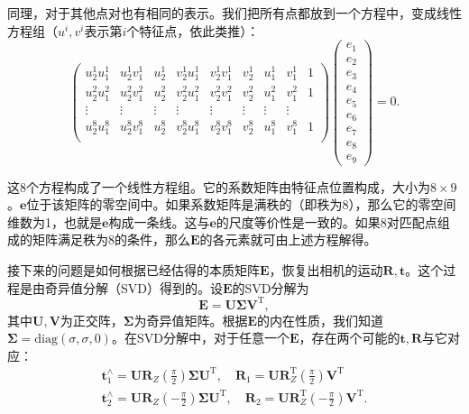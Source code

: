 同理，对于其他点对也有相同的表示。我们把所有点都放到一个方程中，变成线性方程组（$u^i, v^i$表示第$i$个特征点，依此类推）：
\begin{equation}
\label{Eq:eight-point}
\begin{pmatrix}
u_{2}^{1}u_{1}^{1}& u_{2}^{1}v_{1}^{1}& u_{2}^{1}& v_{2}^{1}u_{1}^{1}& v_{2}^{1}v_{1}^{1}& v_{2}^{1} &u_{1}^{1} &v_{1}^{1}&1\\
u_{2}^{2}u_{1}^{2}& u_{2}^{2}v_{1}^{2}& u_{2}^{2}& v_{2}^{2}u_{1}^{2}& v_{2}^{2}v_{1}^{2}& v_{2}^{2} &u_{1}^{2} &v_{1}^{2}&1\\
\vdots & \vdots & \vdots & \vdots & \vdots & \vdots & \vdots & \vdots \\
u_{2}^{8}u_{1}^{8}& u_{2}^{8}v_{1}^{8}& u_{2}^{8}& v_{2}^{8}u_{1}^{8}& v_{2}^{8}v_{1}^{8}& v_{2}^{8} &u_{1}^{8}&v_{1}^{8}&1\\
\end{pmatrix}
\begin{pmatrix}
e_{1}\\ e_{2}\\ e_{3}\\  e_{4}\\ e_{5}\\ e_{6}\\ e_{7}\\ e_{8}\\ e_{9}  
\end{pmatrix}
=0.
\end{equation}

这8个方程构成了一个线性方程组。它的系数矩阵由特征点位置构成，大小为$8 \times 9$。$\bm{e}$位于该矩阵的零空间中。如果系数矩阵是满秩的（即秩为8），那么它的零空间维数为1，也就是$\bm{e}$构成一条线。这与$\bm{e}$的尺度等价性是一致的。如果8对匹配点组成的矩阵满足秩为8的条件，那么$\bm{E}$的各元素就可由上述方程解得。

接下来的问题是如何根据已经估得的本质矩阵$\bm{E}$，恢复出相机的运动$\bm{R}, \bm{t}$。这个过程是由奇异值分解（SVD）得到的。设$\bm{E}$的SVD分解为
\begin{equation}
\bm{E} = \bm{U} \bm{\Sigma} \bm{V}^\mathrm{T},
\end{equation}
其中$\bm{U}, \bm{V}$为正交阵，$\bm{\Sigma}$为奇异值矩阵。根据$\bm{E}$的内在性质，我们知道$\bm{\Sigma} = \mathrm{diag}( \sigma, \sigma, 0 )$。在SVD分解中，对于任意一个$\bm{E}$，存在两个可能的$\bm{t}, \bm{R}$与它对应：
\begin{equation}
\begin{array}{l}
\bm{t}_1^ \wedge  = \bm{U}{\bm{R}_Z}(\frac{\pi }{2}) \bm{\Sigma} {\bm{U}^\mathrm{T}}, \quad {\bm{R}_1} = \bm{U} \bm{R}_Z^\mathrm{T}(\frac{\pi }{2}){ \bm{V}^\mathrm{T}}\\
\bm{t}_2^ \wedge  = \bm{U}{\bm{R}_Z}( - \frac{\pi }{2})\bm{\Sigma} {\bm{U}^\mathrm{T}}, \quad  {\bm{R}_2} = \bm{U} \bm{R}_Z^\mathrm{T}( - \frac{\pi }{2}){\bm{V}^\mathrm{T}}.
\end{array}
\end{equation}

